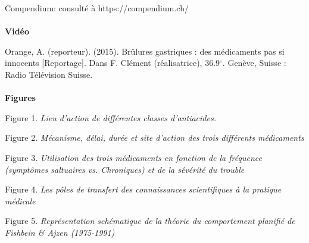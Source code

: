 \begin{thebibliography}{9}
    Compendium: consulté à https://compendium.ch/ \\   
\vspace*{1cm} \\
{\huge{\textbf{Vidéo}}}

Orange, A. (reporteur). (2015). Brûlures gastriques : des médicaments pas si innocents [Reportage]. Dans F. Clément (réalisatrice), 36.9$^{\circ}$. Genève, Suisse : Radio Télévision Suisse. \\
 \vspace*{1cm} \\
{\huge{\textbf{Figures}}}

Figure 1. \textit{Lieu d’action de différentes classes d’antiacides.}

Figure 2. \textit{Mécanisme, délai, durée et site d’action des trois différents médicaments}

Figure 3. \textit{Utilisation des trois médicaments en fonction de la fréquence (symptômes saltuaires     vs. Chroniques) et de la sévérité du trouble}

Figure 4. \textit{Les pôles de transfert des connaissances scientifiques à la pratique médicale}

Figure 5. \textit{Représentation schématique de la théorie du comportement planifié de Fishbein \& Ajzen (1975-1991)}
\end{thebibliography}

